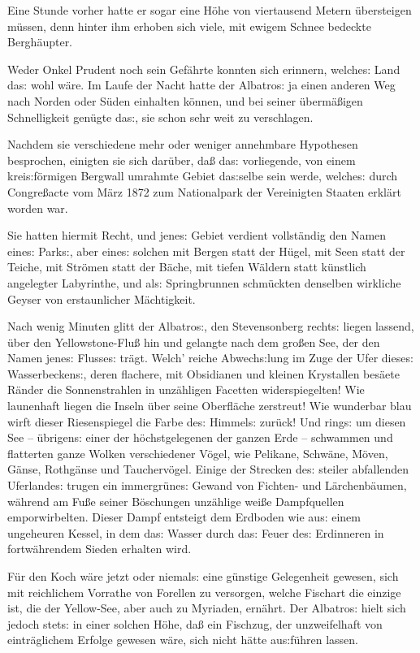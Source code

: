 \documentclass[oneside,12pt]{book}
\newcommand{\s}{s:}
\begin{document}
Eine Stunde vorher hatte er sogar eine H\"ohe von viertausend Metern
\"ubersteigen m\"ussen, denn hinter ihm erhoben sich viele, mit
ewigem Schnee bedeckte Bergh\"aupter.

Weder Onkel Prudent noch sein Gef\"ahrte konnten sich erinnern,
welche{\s} Land da{\s} wohl w\"are. Im Laufe der Nacht hatte der
{\glqq}Albatro{\s}{\grqq} ja einen anderen Weg nach Norden oder
S\"uden einhalten k\"onnen, und bei seiner \"uberm\"a{\ss}igen
Schnelligkeit gen\"ugte da{\s}, sie schon sehr weit zu verschlagen.

Nachdem sie verschiedene mehr oder weniger annehmbare Hypothesen
besprochen, einigten sie sich dar\"uber, da{\ss} da{\s} vorliegende,
von einem krei{\s}f\"ormigen Bergwall umrahmte Gebiet da{\s}selbe
sein werde, welche{\s} durch Congre{\ss}acte vom M\"arz 1872 zum
Nationalpark der Vereinigten Staaten erkl\"art worden war.

Sie hatten hiermit Recht, und jene{\s} Gebiet verdient vollst\"andig
den Namen eine{\s} Park{\s}, aber eine{\s} solchen mit Bergen statt
der H\"ugel, mit Seen statt der Teiche, mit Str\"omen statt der
B\"ache, mit tiefen W\"aldern statt k\"unstlich angelegter
Labyrinthe, und al{\s} Springbrunnen schm\"uckten denselben wirkliche
Geyser von erstaunlicher M\"achtigkeit.

Nach wenig Minuten glitt der {\glqq}Albatro{\s}{\grqq}, den
Stevensonberg recht{\s} liegen lassend, \"uber den
Yellowstone-Flu{\ss} hin und gelangte nach dem gro{\ss}en See, der
den Namen jene{\s} Flusse{\s} tr\"agt. Welch' reiche Abwech{\s}lung
im Zuge der Ufer diese{\s} Wasserbecken{\s}, deren flachere, mit
Obsidianen und kleinen Krystallen bes\"aete R\"ander die
Sonnenstrahlen in unz\"ahligen Facetten widerspiegelten! Wie
launenhaft liegen die Inseln \"uber seine Oberfl\"ache zerstreut! Wie
wunderbar blau wirft dieser Riesenspiegel die Farbe de{\s} Himmel{\s}
zur\"uck! Und ring{\s} um diesen See -- \"ubrigen{\s} einer der
h\"ochstgelegenen der ganzen Erde -- schwammen und flatterten ganze
Wolken verschiedener V\"ogel, wie Pelikane, Schw\"ane, M\"oven,
G\"anse, Rothg\"anse und Taucherv\"ogel. Einige der Strecken de{\s}
steiler abfallenden Uferlande{\s} trugen ein immergr\"une{\s} Gewand
von Fichten- und L\"archenb\"aumen, w\"ahrend am Fu{\ss}e seiner
B\"oschungen unz\"ahlige wei{\ss}e Dampfquellen emporwirbelten.
Dieser Dampf entsteigt dem Erdboden wie au{\s} einem ungeheuren
Kessel, in dem da{\s} Wasser durch da{\s} Feuer de{\s} Erdinneren in
fortw\"ahrendem Sieden erhalten wird.

F\"ur den Koch w\"are jetzt oder niemal{\s} eine g\"unstige
Gelegenheit gewesen, sich mit reichlichem Vorrathe von Forellen zu
versorgen, welche Fischart die einzige ist, die der Yellow-See, aber
auch zu Myriaden, ern\"ahrt. Der {\glqq}Albatro{\s}{\grqq} hielt sich
jedoch stet{\s} in einer solchen H\"ohe, da{\ss} ein Fischzug, der
unzweifelhaft von eintr\"aglichem Erfolge gewesen w\"are, sich nicht
h\"atte au{\s}f\"uhren lassen.
\end{document}
